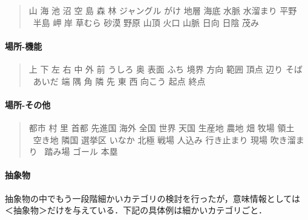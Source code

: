 \documentclass[a4j,titlepage]{jarticle}
\begin{document}
\begin{quote}
山 海 池 沼 空 島 森 林 ジャングル がけ 地層 海底 水脈 水溜まり 平野 
\ 半島 岬 岸 草むら 砂漠 野原 山頂 火口 山脈 日向 日陰 茂み
\end{quote}


\paragraph{場所-機能}

\begin{quote}
上 下 左 右 中 外 前 うしろ 奥 表面 ふち 境界 方向 範囲 頂点 辺り そば
\ あいだ 端 隅 角 隣 先 東 西 向こう 起点 終点
\end{quote}


\paragraph{場所-その他}

\begin{quote}
都市 村 里 首都 先進国 海外 全国 世界 天国 生産地 農地 畑 牧場 領土 
\ 空き地 隣国 選挙区 いなか 北極 戦場 人込み 行き止まり 現場 吹き溜まり 
\ 踏み場 ゴール 本塁
\end{quote}


\paragraph{抽象物}

抽象物の中でもう一段階細かいカテゴリの検討を行ったが，意味情報としては
＜抽象物＞だけを与えている．下記の具体例は細かいカテゴリごと．
\end{document}
